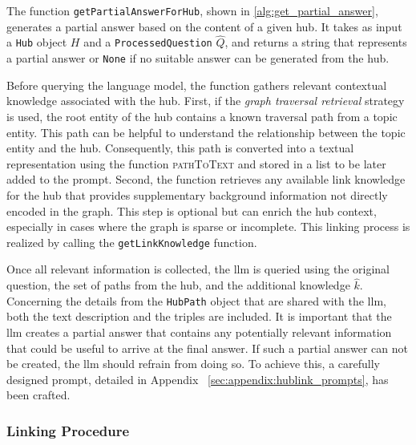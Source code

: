 The function \texttt{getPartialAnswerForHub}, shown in \autoref{alg:get_partial_answer}, generates a partial answer based on the content of a given hub. It takes as input a \texttt{Hub} object \(H\) and a \texttt{ProcessedQuestion} \(\hat{Q}\), and returns a string that represents a partial answer or \texttt{None} if no suitable answer can be generated from the hub.

Before querying the language model, the function gathers relevant contextual knowledge associated with the hub. First, if the \emph{graph traversal retrieval} strategy is used, the root entity of the hub contains a known traversal path from a topic entity. This path can be helpful to understand the relationship between the topic entity and the hub. Consequently, this path is converted into a textual representation using the function \textsc{pathToText} and stored in a list to be later added to the prompt. Second, the function retrieves any available link knowledge for the hub that provides supplementary background information not directly encoded in the graph. This step is optional but can enrich the hub context, especially in cases where the graph is sparse or incomplete. This linking process is realized by calling the \texttt{getLinkKnowledge} function. 

Once all relevant information is collected, the \gls{llm} is queried using the original question, the set of paths from the hub, and the additional knowledge \(\hat{k}\). Concerning the details from the \texttt{HubPath} object that are shared with the \gls{llm}, both the text description and the triples are included. It is important that the \gls{llm} creates a partial answer that contains any potentially relevant information that could be useful to arrive at the final answer. If such a partial answer can not be created, the \gls{llm} should refrain from doing so. To achieve this, a carefully designed prompt, detailed in Appendix ~\ref{sec:appendix:hublink_prompts}, has been crafted.


\subsubsection{Linking Procedure}
\label{sec:linking_procedure}

